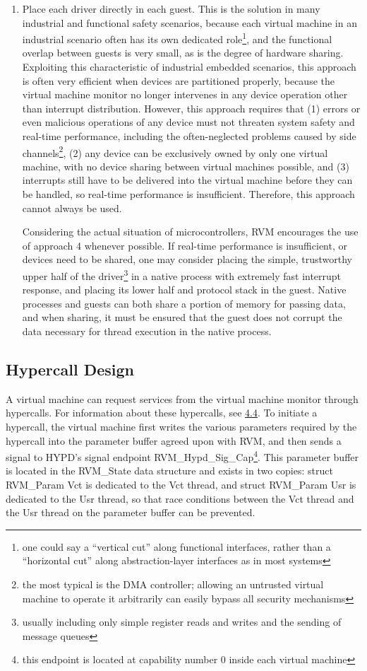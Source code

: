 \begin{enumerate}
\item
  Place each driver directly in each guest. This is the solution in many industrial and functional safety scenarios, because each virtual machine in an industrial scenario often has its own dedicated role\footnote{one could say a ``vertical cut'' along functional interfaces, rather than a ``horizontal cut'' along abstraction-layer interfaces as in most systems}, and the functional overlap between guests is very small, as is the degree of hardware sharing. Exploiting this characteristic of industrial embedded scenarios, this approach is often very efficient when devices are partitioned properly, because the virtual machine monitor no longer intervenes in any device operation other than interrupt distribution. However, this approach requires that (1) errors or even malicious operations of any device must not threaten system safety and real-time performance, including the often-neglected problems caused by side channels\footnote{the most typical is the DMA controller; allowing an untrusted virtual machine to operate it arbitrarily can easily bypass all security mechanisms}, (2) any device can be exclusively owned by only one virtual machine, with no device sharing between virtual machines possible, and (3) interrupts still have to be delivered into the virtual machine before they can be handled, so real-time performance is insufficient. Therefore, this approach cannot always be used.

  Considering the actual situation of microcontrollers, RVM encourages the use of approach 4 whenever possible. If real-time performance is insufficient, or devices need to be shared, one may consider placing the simple, trustworthy upper half of the driver\footnote{usually including only simple register reads and writes and the sending of message queues} in a native process with extremely fast interrupt response, and placing its lower half and protocol stack in the guest. Native processes and guests can both share a portion of memory for passing data, and when sharing, it must be ensured that the guest does not corrupt the data necessary for thread execution in the native process.
\end{enumerate}

\subsection{Hypercall Design}\label{subsec:2-2-6}

A virtual machine can request services from the virtual machine monitor through hypercalls. For information about these hypercalls, see \protect\hyperref[sec:4-4]{4.4}. To initiate a hypercall, the virtual machine first writes the various parameters required by the hypercall into the parameter buffer agreed upon with RVM, and then sends a signal to HYPD's signal endpoint RVM\_Hypd\_Sig\_Cap\footnote{this endpoint is located at capability number 0 inside each virtual machine}. This parameter buffer is located in the RVM\_State data structure and exists in two copies: struct
RVM\_Param Vct is dedicated to the Vct thread, and struct RVM\_Param
Usr is dedicated to the Usr thread, so that race conditions between the Vct thread and the Usr thread on the parameter buffer can be prevented.


